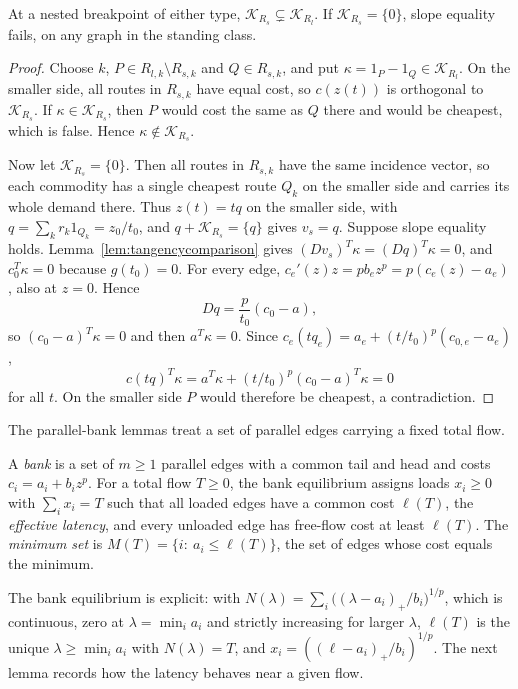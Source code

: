 \begin{lemma}\label{lem:dimension}
At a nested breakpoint of either type, $\mathcal K_{R_s}\subsetneq
\mathcal K_{R_l}$. If $\mathcal K_{R_s}=\{0\}$, slope equality fails, on any
graph in the standing class.
\end{lemma}

\begin{proof}
Choose $k$, $P\in R_{l,k}\setminus R_{s,k}$ and $Q\in R_{s,k}$, and put
$\kappa=1_P-1_Q\in\mathcal K_{R_l}$. On the smaller side, all routes in
$R_{s,k}$ have equal cost, so $c(z(t))$ is orthogonal to $\mathcal K_{R_s}$.
If $\kappa\in\mathcal K_{R_s}$, then $P$ would cost the same as $Q$ there and
would be cheapest, which is false. Hence $\kappa\notin\mathcal K_{R_s}$.

Now let $\mathcal K_{R_s}=\{0\}$. Then all routes in $R_{s,k}$ have the same
incidence vector, so each commodity has a single cheapest route $Q_k$ on the
smaller side and carries its whole demand there. Thus $z(t)=tq$ on the
smaller side, with $q=\sum_kr_k1_{Q_k}=z_0/t_0$, and $q+\mathcal K_{R_s}=\{q\}$
gives $v_s=q$. Suppose slope equality holds. Lemma~\ref{lem:tangencycomparison} gives
$(Dv_s)^T\kappa=(Dq)^T\kappa=0$, and $c_0^T\kappa=0$ because $g(t_0)=0$. For
every edge, $c_e'(z)z=pb_ez^p=p(c_e(z)-a_e)$, also at $z=0$. Hence
\[
 Dq=\frac p{t_0}(c_0-a),
\]
so $(c_0-a)^T\kappa=0$ and then $a^T\kappa=0$. Since
$c_e(tq_e)=a_e+(t/t_0)^p(c_{0,e}-a_e)$,
\[
 c(tq)^T\kappa=a^T\kappa+(t/t_0)^p(c_0-a)^T\kappa=0
\]
for all $t$. On the smaller side $P$ would therefore be cheapest, a
contradiction.
\end{proof}

The parallel-bank lemmas treat a set of parallel edges carrying a fixed total
flow.

\begin{definition}[Banks]\label{def:bank}
A \emph{bank} is a set of $m\ge1$ parallel edges with a common tail and head
and costs $c_i=a_i+b_iz^p$. For a total flow $T\ge0$, the bank equilibrium
assigns loads $x_i\ge0$ with $\sum_ix_i=T$ such that all loaded edges have a
common cost $\ell(T)$, the \emph{effective latency}, and every unloaded edge
has free-flow cost at least $\ell(T)$. The \emph{minimum set} is
$M(T)=\{i:\ a_i\le\ell(T)\}$, the set of edges whose cost equals the minimum.
\end{definition}

The bank equilibrium is explicit: with
$N(\lambda)=\sum_i\bigl((\lambda-a_i)_+/b_i\bigr)^{1/p}$, which is continuous,
zero at $\lambda=\min_ia_i$ and strictly increasing for larger $\lambda$,
$\ell(T)$ is the unique $\lambda\ge\min_ia_i$ with $N(\lambda)=T$, and
$x_i=((\ell-a_i)_+/b_i)^{1/p}$. The next lemma records how the latency
behaves near a given flow.

